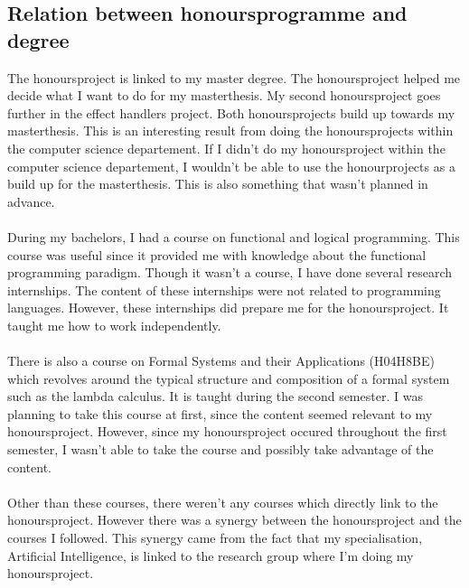 \subsection{Relation between honoursprogramme and degree}
The honoursproject is linked to my master degree. The honoursproject helped me decide what I want to do for my masterthesis. My second honoursproject goes further in the effect handlers project. Both honoursprojects build up towards my masterthesis. This is an interesting result from doing the honoursprojects within the computer science departement. If I didn't do my honoursproject within the computer science departement, I wouldn't be able to use the honourprojects as a build up for the masterthesis. This is also something that wasn't planned in advance.  \\
\\
During my bachelors, I had a course on functional and logical programming. This course was useful since it provided me with knowledge about the functional programming paradigm. Though it wasn't a course, I have done several research internships. The content of these internships were not related to programming languages. However, these internships did prepare me for the honoursproject. It taught me how to work independently. \\
\\
There is also a course on Formal Systems and their Applications (H04H8BE) which revolves around the typical structure and composition of a formal system such as the lambda calculus. It is taught during the second semester. I was planning to take this course at first, since the content seemed relevant to my honoursproject. However, since my honoursproject occured throughout the first semester, I wasn't able to take the course and possibly take advantage of the content. \\
\\
Other than these courses, there weren't any courses which directly link to the honoursproject. However there was a synergy between the honoursproject and the courses I followed. This synergy came from the fact that my specialisation, Artificial Intelligence, is linked to the research group where I'm doing my honoursproject.

